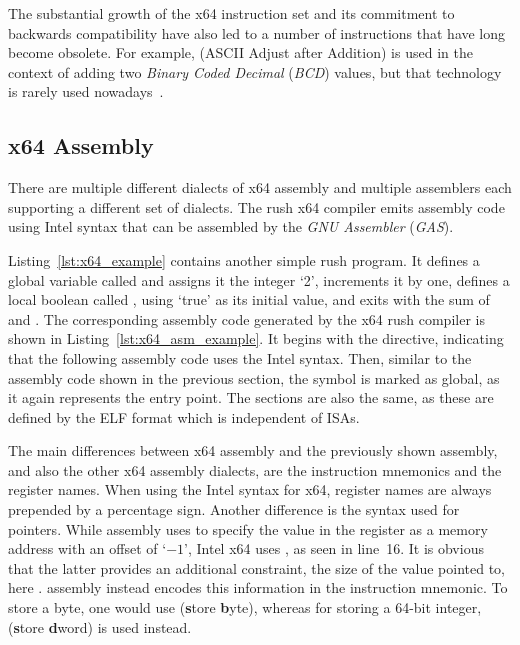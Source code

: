 The substantial growth of the x64 instruction set and its commitment to backwards compatibility have also led to a number of instructions that have long become obsolete.
For example,  (ASCII Adjust after Addition) is used in the context of adding two \emph{Binary Coded Decimal} (\emph{BCD}) values, but that technology is rarely used nowadays~\cite[p.~4]{Patterson2017}.

\subsection{x64 Assembly}


There are multiple different dialects of x64 assembly and multiple assemblers each supporting a different set of dialects.
The rush x64 compiler emits assembly code using Intel syntax that can be assembled by the \emph{GNU Assembler} (\emph{GAS}).

Listing~\ref{lst:x64_example} contains another simple rush program.
It defines a global variable called  and assigns it the integer `2', increments it by one, defines a local boolean called , using `true' as its initial value, and exits with the sum of  and .
The corresponding assembly code generated by the x64 rush compiler is shown in Listing~\ref{lst:x64_asm_example}.
It begins with the  directive, indicating that the following assembly code uses the Intel syntax.
Then, similar to the \riscv{} assembly code shown in the previous section, the  symbol is marked as global, as it again represents the entry point.
The sections are also the same, as these are defined by the ELF format which is independent of ISAs.

The main differences between x64 assembly and the previously shown \riscv{} assembly, and also the other x64 assembly dialects, are the instruction mnemonics and the register names.
When using the Intel syntax for x64, register names are always prepended by a%
%
%
percentage sign.
Another difference is the syntax used for pointers.
While \riscv{} assembly uses  to specify the value in the  register as a memory address with an offset of `$-1$', Intel x64 uses , as seen in line~16.
It is obvious that the latter provides an additional constraint, the size of the value pointed to, here .
\riscv{} assembly instead encodes this information in the instruction mnemonic.
To store a byte, one would use  (\textbf{s}tore \textbf{b}yte), whereas for storing a 64-bit integer,  (\textbf{s}tore \textbf{d}word) is used instead.

